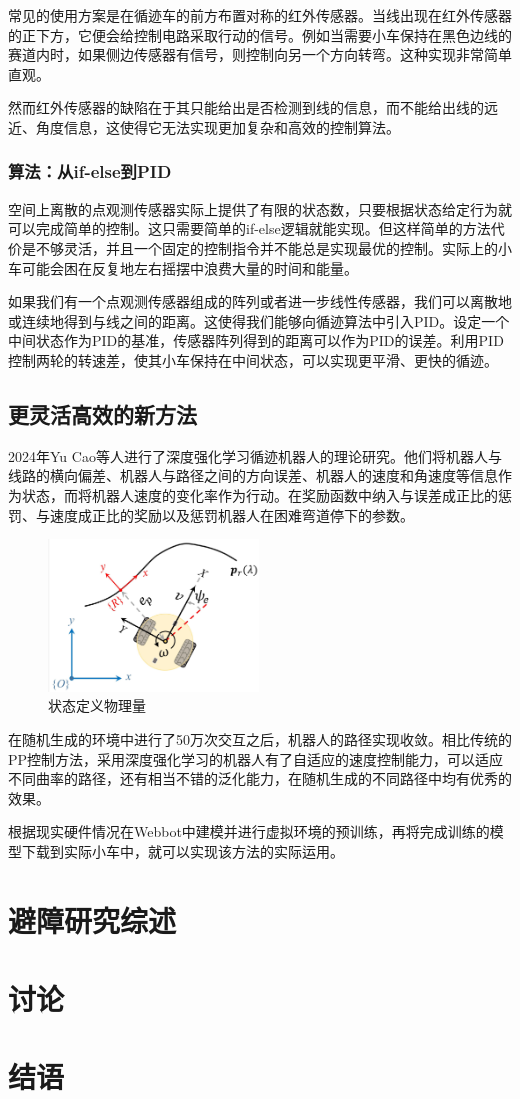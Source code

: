 \documentclass{paper}
\begin{document}
常见的使用方案是在循迹车的前方布置对称的红外传感器。当线出现在红外传感器的正下方，它便会给控制电路采取行动的信号。例如当需要小车保持在黑色边线的赛道内时，如果侧边传感器有信号，则控制向另一个方向转弯。这种实现非常简单直观。

然而红外传感器的缺陷在于其只能给出是否检测到线的信息，而不能给出线的远近、角度信息，这使得它无法实现更加复杂和高效的控制算法。
\subsubsection{算法：从if-else到PID}
\label{subsec:label}
空间上离散的点观测传感器实际上提供了有限的状态数，只要根据状态给定行为就可以完成简单的控制。这只需要简单的if-else逻辑就能实现。但这样简单的方法代价是不够灵活，并且一个固定的控制指令并不能总是实现最优的控制。实际上的小车可能会困在反复地左右摇摆中浪费大量的时间和能量。

如果我们有一个点观测传感器组成的阵列或者进一步线性传感器，我们可以离散地或连续地得到与线之间的距离。这使得我们能够向循迹算法中引入PID。设定一个中间状态作为PID的基准，传感器阵列得到的距离可以作为PID的误差。利用PID控制两轮的转速差，使其小车保持在中间状态，可以实现更平滑、更快的循迹。

\subsection{更灵活高效的新方法}
\label{subsec:label}
2024年Yu Cao等人进行了深度强化学习循迹机器人的理论研究\cite{cao2024path}。他们将机器人与线路的横向偏差、机器人与路径之间的方向误差、机器人的速度和角速度等信息作为状态，而将机器人速度的变化率作为行动。在奖励函数中纳入与误差成正比的惩罚、与速度成正比的奖励以及惩罚机器人在困难弯道停下的参数。

\begin{figure}[ht]
  \centering
  \includegraphics[width=0.5\textwidth]{figures/state.png}
  \caption{状态定义物理量\cite{cao2024path}}
\end{figure}

在随机生成的环境中进行了50万次交互之后，机器人的路径实现收敛。相比传统的PP控制方法，采用深度强化学习的机器人有了自适应的速度控制能力，可以适应不同曲率的路径，还有相当不错的泛化能力，在随机生成的不同路径中均有优秀的效果。

根据现实硬件情况在Webbot中建模并进行虚拟环境的预训练，再将完成训练的模型下载到实际小车中，就可以实现该方法的实际运用。
\section{避障研究综述}
\label{sec:label}



\section{讨论}
\section{结语}




\end{document}
